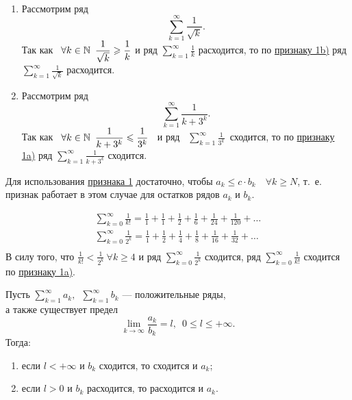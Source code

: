 \documentclass[../../main.tex]{subfiles}
\begin{document}
\begin{examples}

~

\begin{enumerate}
\item
	Рассмотрим ряд
	\[
		 \sum\limits_{k = 1}^\infty\frac{1}{\sqrt{k}}
	.\]
	Так как \  $\forall k \in \mathbb{N} \enspace
	 \dfrac{1}{\sqrt{k}} \geqslant \dfrac{1}{k}$ и ряд 
	 $\displaystyle\sum\limits_{k = 1}^\infty \frac{1}{k}$ расходится,
	то по \hyperref[lec26:comp_test_1]{признаку  1\textdegree b)} ряд
	$\displaystyle\sum\limits_{k = 1}^\infty\frac{1}{\sqrt{k}}$ расходится.
\item
	Рассмотрим ряд
	\[
		 \sum\limits_{k = 1}^\infty\frac{1}{k + 3^k}
	.\]
	Так как \  $\forall k \in \mathbb{N} \enspace
	 \dfrac{1}{{k + 3^k}} \leqslant \dfrac{1}{3^k}$ \  и ряд 
	\ $\displaystyle\sum\limits_{k = 1}^\infty \frac{1}{3^k}$\   сходится,
	то по \hyperref[lec26:comp_test_1]{признаку  1\textdegree a)} ряд
	$\displaystyle \sum\limits_{k = 1}^\infty\frac{1}{k + 3^k}$ сходится.
\end{enumerate}
\end{examples}
\begin{rem}
Для использования \hyperref[lec26:comp_test_1]{признака  1\textdegree} 
достаточно, чтобы $a_k \leq c\cdot b_k\quad \forall k\geq N$, т.~е.
признак работает в этом случае для остатков рядов $a_k$ и $b_k$. 
 \end{rem}
\begin{example}
\begin{gather*}
	\sum\limits_{k = 0}^\infty\frac{1}{k!} = \frac{1}{1} + 
	\frac{1}{1} +  \frac{1}{2} +  \frac{1}{6} +
	\frac{1}{24} +  \frac{1}{120} + \ldots\\
	\sum\limits_{k = 0}^\infty\frac{1}{2^k} = \frac{1}{1} + 
	\frac{1}{2} +  \frac{1}{4} +  \frac{1}{8} +
	\frac{1}{16} +  \frac{1}{32} + \ldots\\
\end{gather*}
	В силу того, что
	$\displaystyle\frac{1}{k!} < \frac{1}{2^k} \  \forall k \geq 4$
	и ряд $\displaystyle\sum\limits_{k = 0}^\infty\frac{1}{2^k}$ сходится,
	ряд $\displaystyle\sum\limits_{k = 0}^\infty\frac{1}{k!}$ сходится по
	 \hyperref[lec26:comp_test_1]{признаку  1\textdegree a)}.
\end{example}
  \begin{thm}
 	\label{lec26:comp_test_2}
 	Пусть $\sum\limits_{k = 1}^\infty a_k,
 	\enspace \sum\limits_{k = 1}^\infty b_k$
 	 --- положительные ряды,\\ 
 	а также существует предел
 	\[
 	\lim\limits_{k \to \infty}\frac{a_k}{b_k} = l,\enspace 0 \leq l \leq +\infty
 	.\]
	Тогда:
	\begin{enumerate}[label={\alph*)}]
	\item если $l < +\infty$ и $b_k$ сходится, то сходится и $a_k$;
	\item если $l > 0$ и $b_k$ расходится, то расходится и $a_k$.
	\end{enumerate}
 \end{thm}
\end{document}
